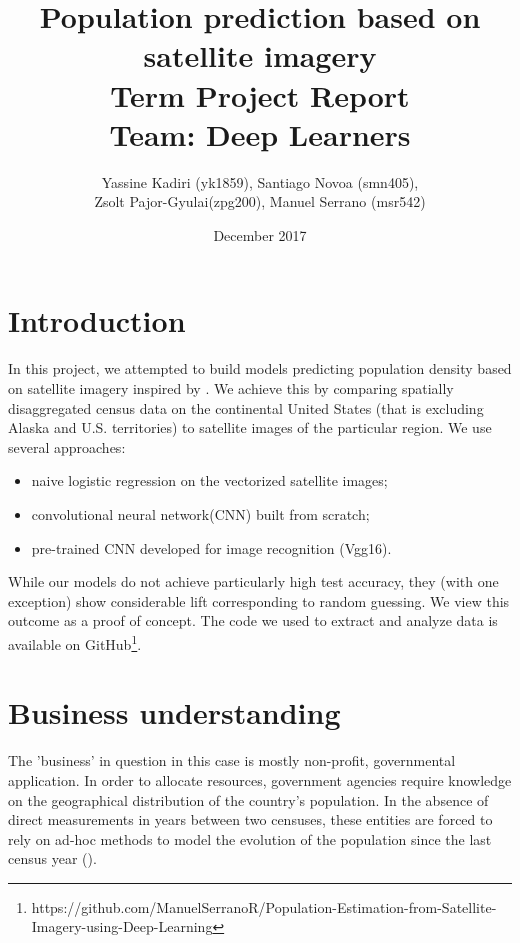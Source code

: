 \documentclass{article}
\begin{document}
\title{Population prediction based on satellite imagery\\
Term Project Report\\
Team: Deep Learners} 

\date{December 2017}
\author{Yassine Kadiri (yk1859), Santiago Novoa (smn405),\\ Zsolt Pajor-Gyulai(zpg200), Manuel Serrano (msr542)}
\maketitle


\doublespacing


\section{Introduction}
In this project, we attempted to build models predicting population density based on satellite imagery inspired by \cite{RHD17}. We achieve this by comparing spatially disaggregated census data on the continental United States (that is excluding Alaska and U.S. territories) to satellite images of the particular region. We use several approaches: 
\begin{itemize}
\item[(1)] naive logistic regression on the vectorized satellite images; 
\item[(2)] convolutional neural network(CNN) built from scratch; \item[(3)] pre-trained CNN developed for image recognition (Vgg16).
\end{itemize}

While our models do not achieve particularly high test accuracy, they (with one exception) show considerable lift corresponding to random guessing. We view this outcome as a proof of concept. The code we used to extract and analyze data is available on GitHub\footnote{https://github.com/ManuelSerranoR/Population-Estimation-from-Satellite-Imagery-using-Deep-Learning}.

\section{Business understanding}
The 'business' in question in this case is mostly non-profit, governmental application. In order to allocate resources, government agencies require knowledge on the geographical distribution of the country's population. In the absence of direct measurements in years between two censuses, these entities are forced to rely on ad-hoc methods to model the evolution of the population since the last census year (\cite{L96}).
\end{document}
